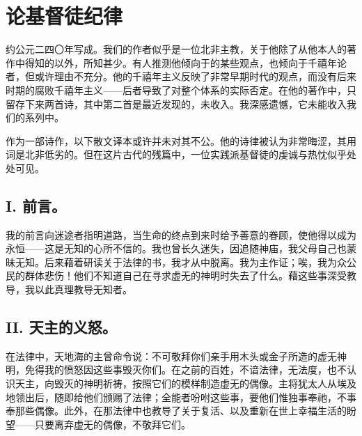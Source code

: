 
\chapter{论基督徒纪律}


\par

约公元二四〇年写成。我们的作者似乎是一位北非主教，关于他除了从他本人的著作中得知的以外，所知甚少。有人推测他倾向于的某些观点，也倾向于千禧年论者，但或许理由不充分。他的千禧年主义反映了非常早期时代的观点，而没有后来时期的腐败千禧年主义——后者导致了对整个体系的实际否定。在他的著作中，只留存下来两首诗，其中第二首是最近发现的，未收入。我深感遗憾，它未能收入我们的系列中。\par

作为一部诗作，以下散文译本或许并未对其不公。他的诗律被认为非常晦涩，其用词是北非低劣的。但在这片古代的残篇中，一位实践派基督徒的虔诚与热忱似乎处处可见。\par


\section{I. 前言。}

我的前言向迷途者指明道路，当生命的终点到来时给予善意的眷顾，使他得以成为永恒——这是无知的心所不信的。我也曾长久迷失，因追随神庙，我父母自己也蒙昧无知。后来藉着研读关于法律的书，我才从中脱离。我为主作证；唉，我为众公民的群体悲伤！他们不知道自己在寻求虚无的神明时失去了什么。藉这些事深受教导，我以此真理教导无知者。\par


\section{II. 天主的义怒。}

在法律中，天地海的主曾命令说：不可敬拜你们亲手用木头或金子所造的虚无神明，免得我的愤怒因这些事毁灭你们。在之前的百姓，不谙法律，无法度，也不认识天主，向毁灭的神明祈祷，按照它们的模样制造虚无的偶像。主将犹太人从埃及地领出后，随即给他们颁赐了法律；全能者吩咐这些事，要他们惟独事奉祂，不事奉那些偶像。此外，在那法律中也教导了关于复活、以及重新在世上幸福生活的盼望——只要离弃虚无的偶像，不敬拜它们。\par

